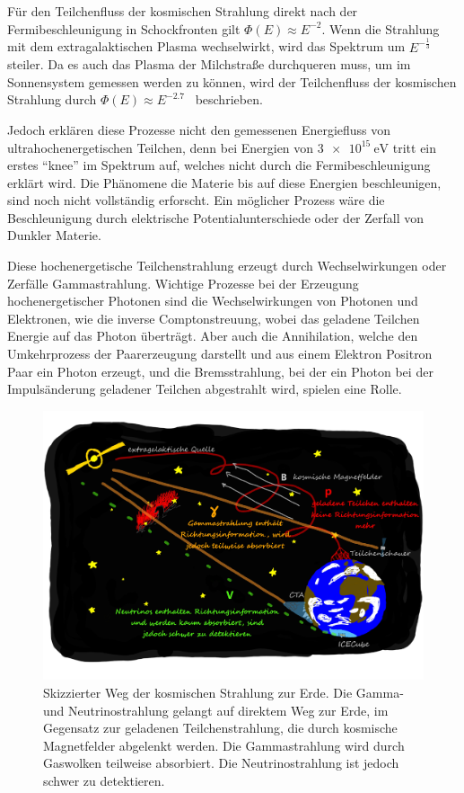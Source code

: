 Für den Teilchenfluss der kosmischen Strahlung direkt nach der Fermibeschleunigung in Schockfronten gilt
$\Phi(E)\approx E^{-2}$.
Wenn die Strahlung mit dem extragalaktischen Plasma wechselwirkt, wird das Spektrum um $E^{-\frac{1}{3}}$ steiler.
Da es auch das Plasma der Milchstraße durchqueren muss, um im Sonnensystem gemessen werden zu können, wird
der Teilchenfluss der kosmischen Strahlung durch $\Phi(E) \approx E^{-2.7}$~\cite[5]{Cosmic_rays} beschrieben.

Jedoch erklären diese Prozesse nicht den gemessenen Energiefluss von ultrahochenergetischen Teilchen, denn bei Energien von $\SI{3e15}{\eV}$ tritt ein erstes
\enquote{knee} im Spektrum auf, welches nicht durch die Fermibeschleunigung erklärt wird.
Die Phänomene die Materie bis auf diese Energien beschleunigen, sind noch nicht vollständig erforscht.
Ein möglicher Prozess wäre die Beschleunigung durch elektrische Potentialunterschiede oder der Zerfall von Dunkler Materie.

Diese hochenergetische Teilchenstrahlung erzeugt durch Wechselwirkungen oder Zerfälle Gammastrahlung.
Wichtige Prozesse bei der Erzeugung hochenergetischer Photonen sind die Wechselwirkungen von Photonen und Elektronen, wie
die inverse Comptonstreuung, wobei das geladene Teilchen Energie auf das Photon
überträgt. Aber auch die Annihilation, welche den Umkehrprozess der Paarerzeugung darstellt und aus einem Elektron Positron Paar
ein Photon erzeugt, und die Bremsstrahlung, bei der ein Photon bei der Impulsänderung geladener Teilchen abgestrahlt wird, spielen eine Rolle.

\begin{figure}
  \includegraphics[width=\textwidth]{Plots/Folie5.pdf}
  \centering
  \caption{Skizzierter Weg der kosmischen Strahlung zur Erde. Die Gamma- und Neutrinostrahlung gelangt auf direktem Weg zur Erde, im Gegensatz
            zur geladenen Teilchenstrahlung, die durch kosmische Magnetfelder abgelenkt werden. Die Gammastrahlung wird durch Gaswolken teilweise
            absorbiert. Die Neutrinostrahlung ist jedoch schwer zu detektieren.}
  \label{abb:Folie5}
\end{figure}

